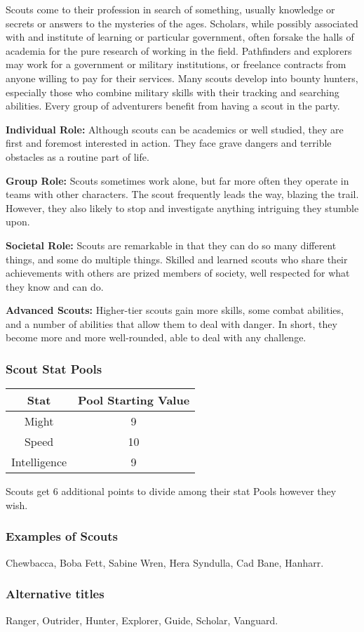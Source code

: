 \documentclass[a4paper,10pt,final,twocolumn,oneside]{book}
\newcommand{\statPool}[5]
{
	\subsubsection*{#1 Stat Pools}
	\label{subsub:#1StatPools}
	\begin{center}
	\begin{tabular}{ |c|c| }
	\hline
	\textbf{Stat} & \textbf{Pool Starting Value} \\
	\hline \hline
	Might & #2 \\
	\hline
 	Speed & #3  \\
 	\hline
 	Intelligence & #4  \\
 	\hline
	\end{tabular}
	\end{center}
	#1s get #5 additional points to divide among their stat Pools however they wish.
}
\newcommand{\itemLine}[2]{\textbf{#1:}{ #2}\par}
\begin{document}
Scouts come to their profession in search of something, usually knowledge or secrets or answers to the mysteries of the ages. Scholars, while possibly associated with and institute of learning or particular government, often forsake the halls of academia for the pure research of working in the field. Pathfinders and explorers may work for a government or military institutions, or freelance contracts from anyone willing to pay for their services. Many scouts develop into bounty hunters, especially those who combine military skills with their tracking and searching abilities. Every group of adventurers benefit from having a scout in the party.

\itemLine{Individual Role}{Although scouts can be academics or well studied, they are first and foremost interested in action. They face grave dangers and terrible obstacles as a routine part of life.}

\itemLine{Group Role}{Scouts sometimes work alone, but far more often they operate in teams with other characters. The scout frequently leads the way, blazing the trail. However, they also likely to stop and investigate anything intriguing they stumble upon.}

\itemLine{Societal Role}{Scouts are remarkable in that they can do so many different things, and some do multiple things. Skilled and learned scouts who share their achievements with others are prized members of society, well respected for what they know and can do.}

\itemLine{Advanced Scouts}{Higher-tier scouts gain more skills, some combat abilities, and a number of abilities that allow them to deal with danger. In short, they become more and more well-rounded, able to deal with any challenge.}

\statPool{Scout}{9}{10}{9}{6}

\subsubsection*{Examples of Scouts}
\label{subsub:scoutExamples}

Chewbacca, Boba Fett, Sabine Wren, Hera Syndulla, Cad Bane, Hanharr.

\subsubsection*{Alternative titles}
\label{subsub:scoutAlternative}

Ranger, Outrider, Hunter, Explorer, Guide, Scholar, Vanguard.
\end{document}
